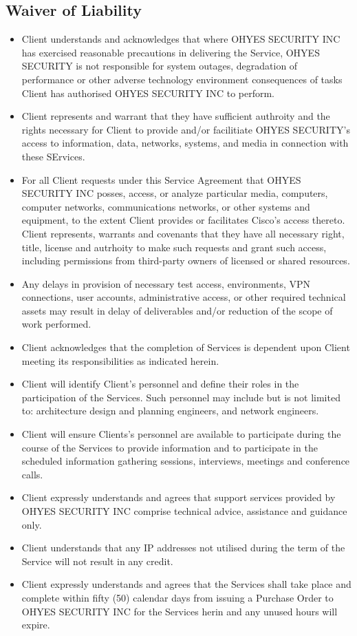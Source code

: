 \documentclass[11pt, oneside]{article}   	%
\newcommand{\myName}{OHYES SECURITY INC}
\begin{document}
\subsection{Waiver of Liability}
\begin{itemize}
\item{
	Client understands and acknowledges that where \myName{} has
	exercised reasonable precautions in delivering the Service, OHYES
	SECURITY is not responsible for system outages, degradation of
	performance or other adverse technology environment consequences of
	tasks Client has authorised \myName{} to perform.
}
\item{
	Client represents and warrant that they have sufficient authroity and
	the rights necessary for Client to provide and/or facilitiate OHYES 
	SECURITY's access to information, data, networks, systems, and media in
	connection with these SErvices.
}
\item{
	For all Client requests under this Service Agreement that \myName{}
	posses, access, or analyze particular media, computers, computer networks,
	communications networks, or other systems and equipment, to the extent
	Client provides or facilitates Cisco's access thereto. Client
	represents, warrants and covenants that they have all necessary right, 
	title, license and autrhoity to make such requests and grant such access, 
	including permissions from third-party owners of licensed or shared resources.
}
\item{
	Any delays in provision of necessary test access, environments, VPN 
	connections, user accounts, administrative access, or other required 
	technical assets may result in delay of deliverables and/or reduction of 
	the scope of work performed.
}
\item {
	Client acknowledges that the completion of Services is dependent upon 
	Client meeting its responsibilities as indicated herein.
}
\item {
	Client will identify Client's personnel and define their roles in the 
	participation of the Services. Such personnel may include but is not limited 
	to: architecture design and planning engineers, and network engineers.
}
\item {
	Client will ensure Clients's personnel are available to participate during 
	the course of the Services to provide information and to participate in the 
	scheduled information gathering sessions, interviews, meetings and conference 
	calls.
}
\item {
	Client expressly understands and agrees that support services provided by 
	\myName{} comprise technical advice, assistance and guidance only.
}
\item {
	Client understands that any IP addresses not utilised during the term of 
	the Service will not result in any credit.
}
\item {
	Client expressly understands and agrees that the Services shall take place 
	and complete within fifty (50) calendar days from issuing a Purchase Order to 
	\myName{} for the Services herin and any unused hours will expire.
}
\end{itemize}
\end{document}
